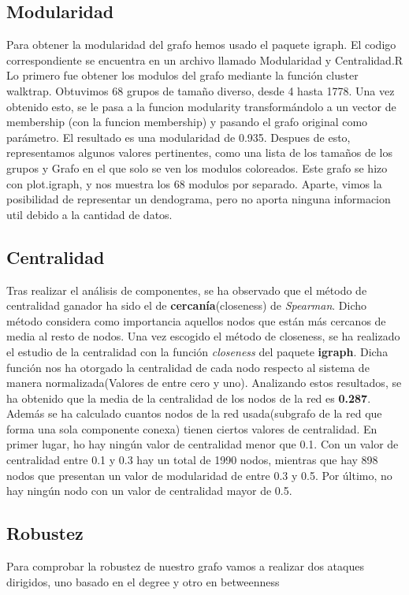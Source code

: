 \subsection{Modularidad}

Para obtener la modularidad del grafo hemos usado el paquete igraph. El codigo correspondiente se encuentra en un archivo llamado Modularidad y Centralidad.R
Lo primero fue obtener los modulos del grafo mediante la función cluster walktrap. Obtuvimos 68 grupos de tamaño diverso, desde 4 hasta 1778. Una vez obtenido esto, se le pasa a la funcion modularity transformándolo a un vector de membership (con la funcion membership) y pasando el grafo original como parámetro. El resultado es una modularidad de 0.935.
Despues de esto, representamos algunos valores pertinentes, como una lista de los tamaños de los grupos y Grafo en el que solo se ven los modulos coloreados.
Este grafo se hizo con plot.igraph, y nos muestra los 68 modulos por separado.
Aparte, vimos la posibilidad de representar un dendograma, pero no aporta ninguna informacion util debido a la cantidad de datos.


\subsection{Centralidad}

Tras realizar el an\'alisis de componentes, se ha observado que el m\'etodo de centralidad ganador ha sido el de \textbf{cercan\'ia}(closeness) de \textit{Spearman}. Dicho método considera como importancia aquellos nodos que están más cercanos de media al resto de nodos.
Una vez escogido el m\'etodo de closeness, se ha realizado el estudio de la centralidad con la funci\'on \textit{closeness} del paquete \textbf{igraph}. Dicha funci\'on nos ha otorgado la centralidad de cada nodo respecto al sistema de manera normalizada(Valores de entre cero y uno).
Analizando estos resultados, se ha obtenido que la media de la centralidad de los nodos de la red es \textbf{0.287}.
Adem\'as se ha calculado cuantos nodos de la red usada(subgrafo de la red que forma una sola componente conexa) tienen ciertos valores de centralidad.
En primer lugar, ho hay ningún valor de centralidad menor que 0.1. Con un valor de centralidad entre 0.1 y 0.3 hay un total de 1990 nodos, mientras que hay 898 nodos que presentan un valor de modularidad de entre 0.3 y 0.5. Por último, no hay ningún nodo con un valor de centralidad mayor de 0.5.


\subsection{Robustez}

Para comprobar la robustez de nuestro grafo vamos a realizar dos ataques dirigidos, uno basado en el degree y otro en betweenness

